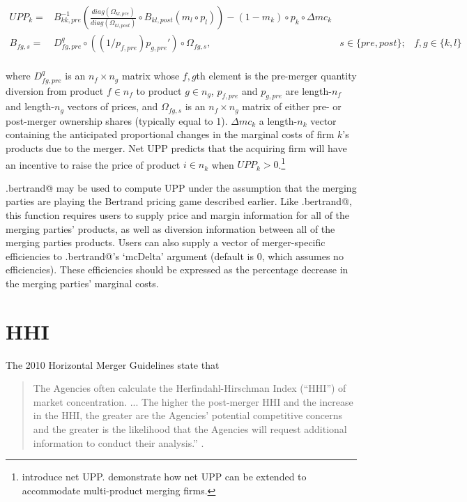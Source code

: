 \documentclass[11pt,numbers=noenddot,pointlessnumbers]{scrreprt}
\numberwithin{equation}{section}
\begin{document}
\begin{align*}
  UPP_k=&B_{kk,pre}^{-1}\left(\frac{diag(\Omega_{kl,pre})}{diag(\Omega_{kl,post})}\circ
  B_{kl,post}(m_l\circ p_l)\right) - (1-m_k)\circ p_k\circ\Delta mc_k&&\\
  B_{fg,s}=&D^q_{fg,pre}\circ((1/p_{f,pre})p_{g,pre}')\circ\Omega_{fg,s},& s
  \in \{pre,post\};& f,g\in \{k,l\}\\
\end{align*}

where $D^q_{fg,pre}$ is an $n_f\times n_g$ matrix whose
$f,g$th element is the pre-merger quantity diversion from product $f\in n_f$ to product
$g\in n_g$, $p_{f,pre}$ and $p_{g,pre}$
are length-$n_f$ and length-$n_g$ vectors of prices, and
$\Omega_{fg,s}$ is an $n_f\times n_g$ matrix of either pre- or
post-merger ownership shares (typically equal to 1).
$\Delta mc_k$ a length-$n_k$ vector containing the anticipated proportional changes in
the marginal costs of firm $k$'s products due to the merger. Net UPP
predicts that the acquiring firm will have an incentive to raise the
price of product $i\in n_k$ when $UPP_k>0$.\footnote{\cite{Farrell2010a} introduce net UPP. \cite{Jaffe2012}
demonstrate how net UPP can be extended to accommodate multi-product
merging firms.}

\verb@upp.bertrand@ may be used to compute UPP under the assumption
that the merging parties are playing the Bertrand pricing game
described earlier. Like \verb@cmcr.bertrand@, this function requires
users to supply price and margin information for all of the merging parties' products, as well
as diversion information between all of the merging parties
products. Users can  also supply a vector of merger-specific
efficiencies to \verb@upp.bertrand@'s `mcDelta' argument (default is
0, which assumes no efficiencies). These
efficiencies should be expressed as the percentage decrease in the
merging parties' marginal costs.

\section{HHI}
The 2010 Horizontal Merger Guidelines state that

\begin{quote}
The Agencies often calculate the Herfindahl-Hirschman Index (“HHI”)
of market concentration. ... The higher the post-merger HHI and the increase in the HHI,
the greater are the Agencies’ potential competitive concerns and the greater is the likelihood that
the Agencies will request additional information to conduct their
analysis.'' \cite[p.~18]{HMG2010}.
\end{quote}
\end{document}
